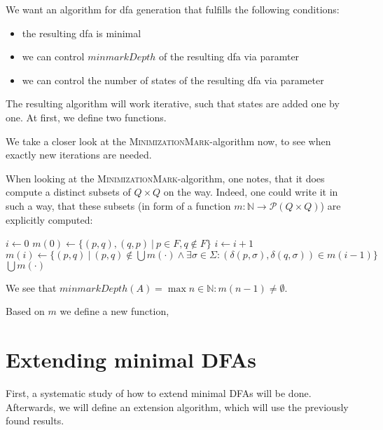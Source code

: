 \documentclass[a4paper, oneside, 11pt]{report}
\theoremstyle{definition}
\theoremstyle{remark}
\newcommand{\MinMark}{\textsc{MinimizationMark}}
\begin{document}
%

We want an algorithm for dfa generation that fulfills the following conditions:
\begin{itemize}
	\item the resulting dfa is minimal
	\item we can control $minmarkDepth$ of the resulting dfa via paramter
	\item we can control the number of states of the resulting dfa via parameter
\end{itemize}
The resulting algorithm will work iterative, such that states are added one by one.
At first, we define two functions.

We take a closer look at the \MinMark-algorithm now, to see when exactly new iterations are needed. %

When looking at the \MinMark-algorithm, one notes, that it does compute a distinct subsets of $Q \times Q$ on the way. Indeed, one could write it in such a way, that these subsets (in form of a function $m\colon\mathbb{N}\to\mathcal{P}(Q\times Q)$) are explicitly computed:

\begin{algorithmic}[1]
	\State $i \gets 0$
	\State $m(0) \gets \{ (p,q), (q,p)\ |\ p \in F, q \notin F \}$
	\Do
	\State $i \gets i + 1$
	\State $m(i) \gets \{ (p,q)\ |\ (p,q) \notin \bigcup{m(\cdot)} \land \exists \sigma \in \Sigma \colon (\delta(p,\sigma), \delta(q,\sigma)) \in m(i-1) \}$
	\State \Return $\bigcup{m(\cdot)}$
	\EndFunction
\end{algorithmic}
We see that $minmarkDepth(A) = \max n\in\mathbb{N}\colon m(n-1)\neq\emptyset$.

Based on $m$ we define a new function, 

\chapter{Extending minimal DFAs}

First, a systematic study of how to extend minimal DFAs will be done. Afterwards, we will define an extension algorithm, which will use the previously found results.
\end{document}
